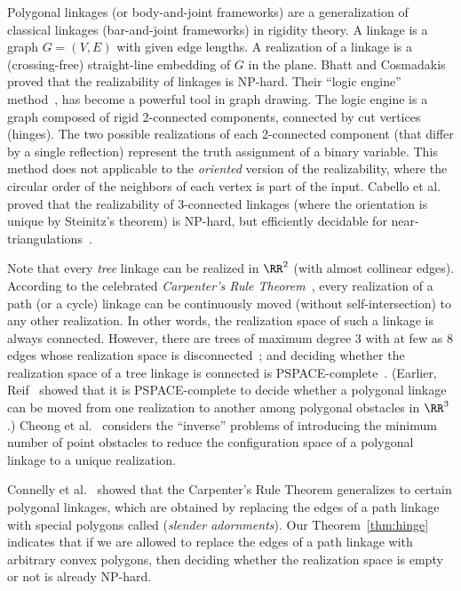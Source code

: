 \smallskip{}
Polygonal linkages (or body-and-joint frameworks) are a generalization of classical linkages 
(bar-and-joint frameworks) in rigidity theory. A linkage is a graph $G=(V,E)$ with given edge 
lengths. A realization of a linkage is a (crossing-free) straight-line embedding of $G$ in the 
plane.
Bhatt and Cosmadakis~\cite{BC87} proved that the realizability of linkages is NP-hard.
Their ``logic engine'' method~\cite{SFM+11,BET+99,FHW97,HK01}, has become a powerful tool in graph 
drawing.
The logic engine is a graph composed of rigid 2-connected components, connected by cut vertices 
(hinges). The two possible realizations of each 2-connected component (that differ by a single 
reflection)  represent the truth assignment of a binary variable. This method does not applicable to 
the \emph{oriented} version of the realizability, where the circular order of the neighbors of each 
vertex is part of the input. Cabello et al.~\cite{CDR07,EW90} proved that the realizability of 
3-connected linkages (where the orientation is unique by Steinitz's theorem) is NP-hard, but 
efficiently decidable for near-triangulations~\cite{CDR07,BV96}.

Note that every \emph{tree} linkage can be realized in $\RR^2$ (with almost collinear edges). 
According to the celebrated \emph{Carpenter's Rule Theorem}~\cite{CDR03,Str05}, every realization of 
a path (or a cycle) linkage can be continuously moved (without self-intersection) to any other 
realization. In other words, the realization space of such a linkage is always connected. However, 
there are trees of maximum degree 3 with at few as 8 edges whose realization space is 
disconnected~\cite{BCD+09}; and deciding whether the realization space of a tree linkage
is connected is PSPACE-complete~\cite{AKR+04}. (Earlier, Reif~\cite{Rei79} showed that it is 
PSPACE-complete to decide whether a polygonal linkage can be moved from one realization to another 
among polygonal obstacles in $\RR^3$.) Cheong et al.~\cite{CdG+07} considers the ``inverse'' 
problems of introducing the minimum number of point obstacles to reduce the configuration space of a 
polygonal linkage to a unique realization.


Connelly et al.~\cite{CDD+10} showed that the Carpenter's Rule Theorem generalizes to certain 
polygonal linkages, which are obtained by replacing the edges of a path linkage with special 
polygons called (\emph{slender adornments}). Our Theorem~\ref{thm:hinge} indicates that if we are 
allowed to replace the edges of a path linkage with arbitrary convex polygons, then deciding whether 
the realization space is empty or not is already NP-hard.

